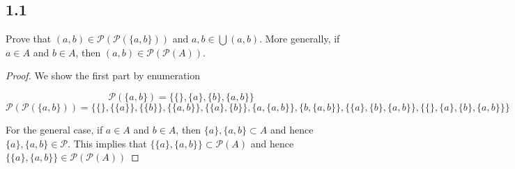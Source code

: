 \subsection*{1.1} Prove that $(a,b) \in \mathcal{P}(\mathcal{P}(\{a,b\}))$ and $a,b \in \bigcup(a,b)$. More generally, if $a \in A$ and $b \in A$, then $(a,b) \in \mathcal{P}(\mathcal{P}(A))$.

\begin{proof}
We show the first part by enumeration

$$ \mathcal{P}(\{a,b\}) = \{\{\}, \{a\}, \{b\}, \{a,b\}\}$$
$$ \mathcal{P}(\mathcal{P}(\{a,b\})) = \{\{\}, \{\{a\}\}, \{\{b\}\}, \{\{a,b\}\}, \{\{a\}, \{b\}\}, \{a, \{a,b\}\}, \{b, \{a, b\}\}, \{\{a\}, \{b\}, \{a,b\}\}, \{\{\}, \{a\}, \{b\}, \{a,b\}\}\}$$

For the general case, if $a \in A$ and $b \in A$, then $\{a\}, \{a,b\} \subset A$ and hence $\{a\}, \{a,b\} \in \mathcal{P}$. This implies that $\{\{a\}, \{a,b\}\} \subset \mathcal{P}(A)$ and hence $\{\{a\}, \{a,b\}\} \in \mathcal{P}(\mathcal{P}(A))$

\end{proof}

